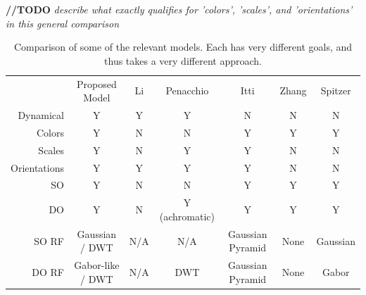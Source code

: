 \documentclass[journal,onecolumn]{IEEEtran}
\begin{document}
\textbf{//TODO} \textit{describe what exactly qualifies for 'colors', 'scales', and 'orientations' in this general comparison}

\begin{table}
    \label{tab:model-comparison}
    \centering
    \begin{threeparttable}
    \caption{Comparison of some of the relevant models. Each has very different goals, and thus takes a very different approach.}
    \begin{tabular}{rcccccc}
        \multicolumn{1}{r|}{}                 & Proposed Model        & Li \cite{li:1999}     & Penacchio \cite{penacchio:2013} & Itti \cite{itti:1998} & Zhang \cite{zhang:2012} & Spitzer \cite{spitzer:2005} \\ \cline{1-7}
        \multicolumn{1}{r|}{Dynamical}        & Y                      & Y                    & Y                              & N                     & N                       & N               \\
        \multicolumn{1}{r|}{Colors}           & Y                      & N                    & N                              & Y                     & Y                       & Y               \\
        \multicolumn{1}{r|}{Scales}           & Y                      & N                    & Y                              & Y                     & N                       & N               \\
        \multicolumn{1}{r|}{Orientations}     & Y                      & Y                    & Y                              & Y                     & N                       & N               \\
        \multicolumn{1}{r|}{SO}               & Y                      & N                    & N                              & Y                     & Y                       & Y               \\
        \multicolumn{1}{r|}{DO}               & Y                      & N                    & Y (achromatic)                 & Y                     & Y                       & Y               \\
        \multicolumn{1}{r|}{SO RF}            & Gaussian / DWT         & N/A                  & N/A                            & Gaussian Pyramid      & None                    & Gaussian        \\
        \multicolumn{1}{r|}{DO RF}            & Gabor-like / DWT       & N/A                  & DWT                            & Gaussian Pyramid      & None                    & Gabor           \\

\end{tabular}
\end{threeparttable}
\end{table}
\end{document}
